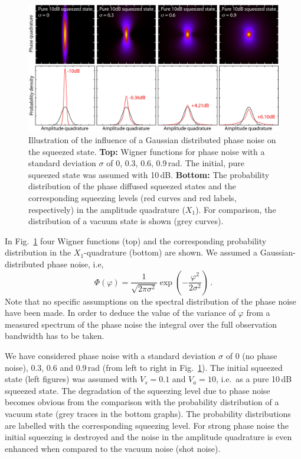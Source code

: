 \begin{figure}
\centering
\includegraphics[scale=0.77]{./Sec_Optics/Wig_10dB_all.jpg}
\caption{Illustration of the influence of a Gaussian distributed phase noise on the squeezed state. \textbf{Top:} Wigner functions for phase noise  with a standard deviation $\sigma$ of 0, 0.3, 0.6, 0.9\,rad. The initial, pure squeezed state was assumed with 10\,dB. \textbf{Bottom:} The probability distribution of the phase diffused squeezed states and the corresponding squeezing levels (red curves and red labels, respectively) in the  amplitude quadrature ($X_1$).  For comparison, the distribution of a vacuum state is shown (grey curves).}
\label{fig:phasediffusedSQZ}
\end{figure}

In Fig.~\ref{fig:phasediffusedSQZ} four Wigner functions  (top) and the corresponding probability distribution in the $X_1$-quadrature (bottom) are shown. We assumed a Gaussian-distributed phase noise, i.e,
\begin{equation}
\Phi(\varphi) = \frac{1}{\sqrt{2\pi\sigma^2}} \exp\left(-\frac{\varphi^2}{2\sigma^2}\right)\,.
\end{equation}
Note that no specific assumptions on the spectral distribution of the phase noise have been made. In order to deduce the value of the variance of $\varphi$ from a measured spectrum of the phase noise the integral over the full observation bandwidth has to be taken.

We have considered phase noise with  a standard deviation $\sigma$ of 0 (no phase noise), 0.3, 0.6 and 0.9\,rad (from left to right in Fig.~\ref{fig:phasediffusedSQZ}). The initial squeezed state (left figures) was assumed with $V_s=0.1$ and $V_a=10$, i.e.\ as a pure 10\,dB squeezed state. The degradation of the squeezing level due to phase noise becomes obvious from the comparison with the probability distribution of a vacuum state (grey traces in the bottom graphs). The probability distributions are labelled with the corresponding squeezing level. For strong phase noise  the initial squeezing is destroyed and the noise in the amplitude quadrature is even enhanced when compared to the vacuum noise (shot noise).





